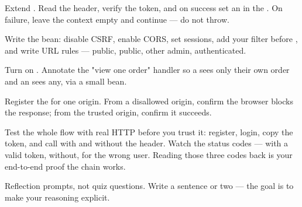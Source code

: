 Extend . Read the  header, verify the token, and on success set an  in the . On failure, leave the context empty and continue --- do not throw.

Write the  bean: disable CSRF, enable CORS, set  sessions, add your filter before , and write URL rules ---  public,  public, other  admin,  authenticated.

Turn on . Annotate the "view one order" handler so a  sees only their own order and an  sees any, via a small  bean.

Register the  for one origin. From a disallowed origin, confirm the browser blocks the response; from the trusted origin, confirm it succeeds.

\begin{prodtip}
Test the whole flow with real HTTP before you trust it: register, login, copy the token, and call  with and without the  header. Watch the status codes ---  with a valid token,  without,  for the wrong user. Reading those three codes back is your end-to-end proof the chain works.
\end{prodtip}


Reflection prompts, not quiz questions. Write a sentence or two --- the goal is to make your reasoning explicit.

